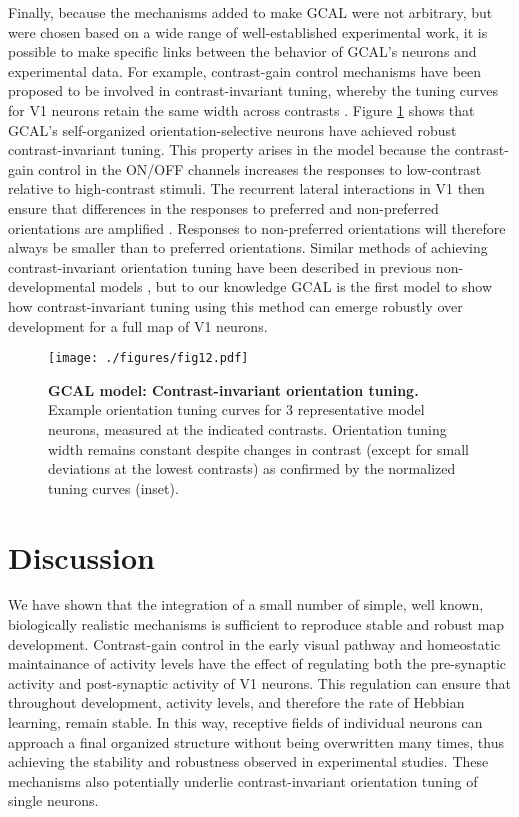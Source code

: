\documentclass{article}
\def \scalefactor {0.666666}
\def \ORTuningScale {\scalefactor}         %
\begin{document}
Finally, because the mechanisms added to make GCAL were not arbitrary,
but were chosen based on a wide range of well-established
experimental work, it is possible to make specific links between the
behavior of GCAL's neurons and experimental data.  For example,
contrast-gain control mechanisms have been proposed to be involved in
contrast-invariant tuning, whereby the tuning curves for V1 neurons
retain the same width across contrasts \citep{Sclar1982,Skottun1987}.
Figure \ref{fig:tuningcurves} shows that GCAL's self-organized
orientation-selective neurons have achieved robust contrast-invariant
tuning.  This property arises in the model because the
contrast-gain control in the ON/OFF channels increases the responses
to low-contrast relative
to high-contrast stimuli.  The recurrent lateral interactions in V1
then ensure that differences in the responses to preferred and
non-preferred orientations are amplified \citep{antolik:phd10}. Responses to non-preferred
orientations will therefore always be smaller than to preferred
orientations. Similar methods of achieving contrast-invariant
orientation tuning have been described in previous non-developmental
models \citep{Geisler1997,Anderson2000,Carandini2002,Finn2007}, but
to our knowledge GCAL is the first model to show how
contrast-invariant tuning using this method can emerge robustly over
development for a full map of V1 neurons.
\begin{figure}
\centerline{
\texttt{[image: ./figures/fig12.pdf]}
}
\caption[Contrast invariant orientation tuning curves]
        {\textbf{GCAL model: Contrast-invariant orientation tuning.}
          Example orientation tuning curves for 3 representative model
          neurons, measured at the indicated contrasts. Orientation
          tuning width remains constant despite
          changes in contrast (except for small deviations at the
          lowest contrasts) as confirmed by the normalized tuning
          curves (inset).}
    \label{fig:tuningcurves}
\end{figure}

\section{Discussion}

We have shown that the integration of a small number of simple, well
known, biologically realistic mechanisms is sufficient to reproduce
stable and robust map development. Contrast-gain control in the early
visual pathway and homeostatic maintainance of activity levels have
the effect of regulating both the pre-synaptic activity and
post-synaptic activity of V1 neurons. This regulation can ensure that
throughout development, activity levels, and therefore the rate of
Hebbian learning, remain stable.  In this way, receptive fields of
individual neurons can approach a final organized structure without
being overwritten many times, thus achieving the stability and
robustness observed in experimental studies. These mechanisms also
potentially underlie contrast-invariant orientation tuning of
single neurons.
\end{document}

